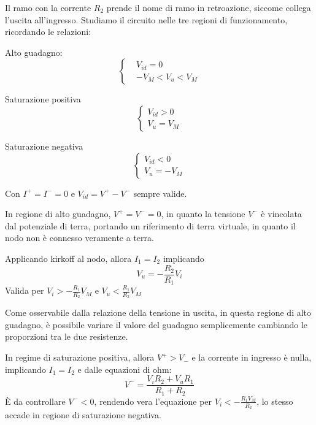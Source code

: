 \documentclass[../template]{subfiles}
\begin{document}
Il ramo con la corrente $R_2$ prende il nome di ramo in retroazione, siccome collega l'uscita all'ingresso.
Studiamo il circuito nelle tre regioni di funzionamento, ricordando le relazioni:

\begin{minipage}{.3\textwidth}
    Alto guadagno:
    \[\begin{cases}
        &V_{id} = 0\\
        &-V_M < V_u < V_M
    \end{cases}\]
\end{minipage}
\begin{minipage}{.3\textwidth}
    Saturazione positiva
    \[\begin{cases}
        V_{id} > 0\\
        V_u = V_M
    \end{cases}\]
\end{minipage}
\begin{minipage}{.3\textwidth}
    Saturazione negativa
    \[\begin{cases}
        V_{id} < 0\\
        V_u = -V_M
    \end{cases}\]
\end{minipage}
Con $I^+ = I^- = 0$ e $V_{id} = V^+ - V^-$ sempre valide.

\begin{tcolorbox}
    In regione di alto guadagno, $V^+ = V^- = 0$, in quanto la tensione $V^-$ è vincolata dal potenziale di terra, portando un riferimento di terra virtuale, in quanto il nodo non è connesso veramente a terra.

    Applicando kirkoff al nodo, allora $I_1 = I_2$ implicando
    \[
        V_u = - \frac{R_2}{R_1} V_i
    \]
    Valida per $V_i > -\frac{R_1}{R_2}V_M$ e $V_u < \frac{R_1}{R_2} V_M$

    Come osservabile dalla relazione della tensione in uscita, in questa regione di alto guadagno, è possibile variare il valore del guadagno semplicemente cambiando le proporzioni tra le due resistenze.
\end{tcolorbox}
\begin{tcolorbox}
    In regime di saturazione positiva, allora $V^+ > V_-$ e la corrente in ingresso è nulla, implicando $I_1 = I_2$ e dalle equazioni di ohm:
    \[
        V^- = \frac{V_i R_2 + V_u R_1}{R_1 + R_2}
    \]
    È da controllare $V^- < 0$, rendendo vera l'equazione per $V_i < - \frac{R_1 V_M}{R_2}$, lo stesso accade in regione di saturazione negativa.
\end{tcolorbox}
\begin{center}
\end{center}
\end{document}

